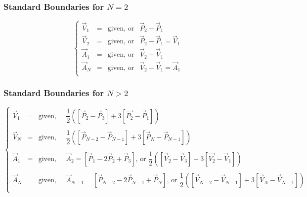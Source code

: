 \documentclass[aps,12pt]{revtex4}
\begin{document}
\subsubsection{Standard Boundaries for $N=2$}
\begin{equation}
\left\lbrace
\begin{array}{rcll}
\vec{V}_1 & = & \text{given, or} & \vec{P}_2 - \vec{P}_1\\ 
\vec{V}_2 & = & \text{given, or} & \vec{P}_2 - \vec{P}_1 = \vec{V}_1\\
\vec{A}_1 & = & \text{given, or} & \vec{V}_2 - \vec{V}_1\\ 
\vec{A}_N & = & \text{given, or} & \vec{V}_2 - \vec{V}_1=\vec{A}_1\\ 
\end{array} 
\right.
\end{equation}

\subsubsection{Standard Boundaries for $N>2$}
\begin{equation}
\left\lbrace
\begin{array}{rcll}
\vec{V}_1 & = & \text{given, or} & \dfrac{1}{2}\left( \left[\vec{P}_2 - \vec{P}_3\right] + 3\left[\vec{P_2}-\vec{P}_1\right] \right)\\ 
\\
\vec{V}_N & = & \text{given, or} & \dfrac{1}{2}\left( \left[\vec{P}_{N-2}-\vec{P}_{N-1}\right]  + 3\left[\vec{P}_{N} - \vec{P}_{N-1}\right] \right)\\
\\
\vec{A}_1 & = & \text{given, or} &  \vec{A}_2=\left[\vec{P}_1 - 2\vec{P}_2 + \vec{P}_3\right] \text{, or } \dfrac{1}{2}\left( \left[\vec{V}_2 - \vec{V}_3\right] + 3\left[\vec{V_2}-\vec{V}_1\right] \right)\\ 
\\
\vec{A}_N & = & \text{given, or} &   \vec{A}_{N-1}=\left[\vec{P}_{N-2} - 2\vec{P}_{N-1} + \vec{P}_{N}\right] \text{, or } \dfrac{1}{2}\left( \left[\vec{V}_{N-2}-\vec{V}_{N-1}\right]  + 3\left[\vec{V}_{N} - \vec{V}_{N-1}\right] \right)\\ 
\end{array}
\right.
\end{equation}
\end{document}
